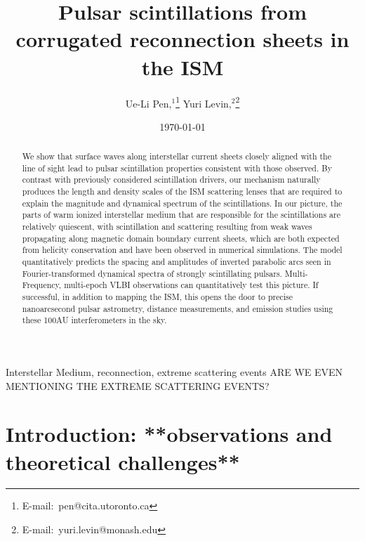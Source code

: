 \documentclass[useAMS,usenatbib]{mn2e}
\title[Interstellar Plasma Scattering]{
Pulsar scintillations from corrugated reconnection sheets in the ISM
}
\author[Pen and Levin]{Ue-Li
  Pen,$^{1}$\thanks{E-mail:\ pen@cita.utoronto.ca}
Yuri Levin,$^2$\thanks{E-mail:\ yuri.levin@monash.edu}
}
\begin{document}
\date{\today}

\pagerange{\pageref{firstpage}--\pageref{lastpage}} 

\maketitle
\label{firstpage}
\begin{abstract}

We show that surface waves along interstellar current sheets closely
aligned with the line of sight lead to pulsar scintillation properties
consistent with those observed.  By contrast with previously
considered scintillation drivers, our mechanism naturally produces the
length and density scales of the ISM scattering lenses that are
required to explain the magnitude and dynamical spectrum of the
scintillations.  In our picture, the parts of warm ionized
interstellar medium that are responsible for the scintillations are
relatively quiescent, with scintillation and scattering resulting from
weak waves propagating along magnetic domain boundary current sheets,
which are both expected from helicity conservation and have been
observed in numerical simulations.  The model quantitatively predicts
the spacing and amplitudes of inverted parabolic arcs seen in
Fourier-transformed dynamical spectra of strongly scintillating
pulsars. Multi-Frequency, multi-epoch VLBI observations can
quantitatively test this picture.  If successful, in addition to
mapping the ISM, this opens the door to precise nanoarcsecond pulsar
astrometry, distance measurements, and emission studies using these
100AU interferometers in the sky. 

\end{abstract}
\begin{keywords}
Interstellar Medium, reconnection, extreme scattering events ARE WE EVEN MENTIONING THE 
EXTREME SCATTERING EVENTS?
\end{keywords}

\newcommand{\be}{\begin{eqnarray}}
\newcommand{\ee}{\end{eqnarray}}
\newcommand{\beq}{\begin{equation}}
\newcommand{\eeq}{\end{equation}}

\section{Introduction: **observations and theoretical challenges**}
\end{document}
